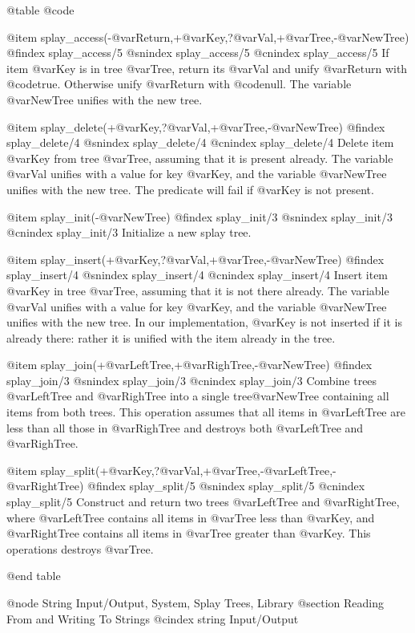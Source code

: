 @table @code

@item splay_access(-@var{Return},+@var{Key},?@var{Val},+@var{Tree},-@var{NewTree})
@findex splay_access/5
@snindex splay_access/5
@cnindex splay_access/5
If item @var{Key} is in tree @var{Tree}, return its @var{Val} and
unify @var{Return} with @code{true}. Otherwise unify @var{Return} with
@code{null}. The variable @var{NewTree} unifies with the new tree.

@item splay_delete(+@var{Key},?@var{Val},+@var{Tree},-@var{NewTree})
@findex splay_delete/4
@snindex splay_delete/4
@cnindex splay_delete/4
Delete item @var{Key} from tree @var{Tree}, assuming that it is present
already. The variable @var{Val} unifies with a value for key @var{Key},
and the variable @var{NewTree} unifies with the new tree. The predicate
will fail if @var{Key} is not present.

@item splay_init(-@var{NewTree})
@findex splay_init/3
@snindex splay_init/3
@cnindex splay_init/3
Initialize a new splay tree.

@item splay_insert(+@var{Key},?@var{Val},+@var{Tree},-@var{NewTree})
@findex splay_insert/4
@snindex splay_insert/4
@cnindex splay_insert/4
Insert item @var{Key} in tree @var{Tree}, assuming that it is not
there already. The variable @var{Val} unifies with a value for key
@var{Key}, and the variable @var{NewTree} unifies with the new
tree. In our implementation, @var{Key} is not inserted if it is
already there: rather it is unified with the item already in the tree.

@item splay_join(+@var{LeftTree},+@var{RighTree},-@var{NewTree})
@findex splay_join/3
@snindex splay_join/3
@cnindex splay_join/3
Combine trees @var{LeftTree} and @var{RighTree} into a single
tree@var{NewTree} containing all items from both trees. This operation
assumes that all items in @var{LeftTree} are less than all those in
@var{RighTree} and destroys both @var{LeftTree} and @var{RighTree}.

@item splay_split(+@var{Key},?@var{Val},+@var{Tree},-@var{LeftTree},-@var{RightTree})
@findex splay_split/5
@snindex splay_split/5
@cnindex splay_split/5
Construct and return two trees @var{LeftTree} and @var{RightTree},
where @var{LeftTree} contains all items in @var{Tree} less than
@var{Key}, and @var{RightTree} contains all items in @var{Tree}
greater than @var{Key}. This operations destroys @var{Tree}.

@end table

@node String Input/Output, System, Splay Trees, Library
@section Reading From and Writing To Strings
@cindex string Input/Output


